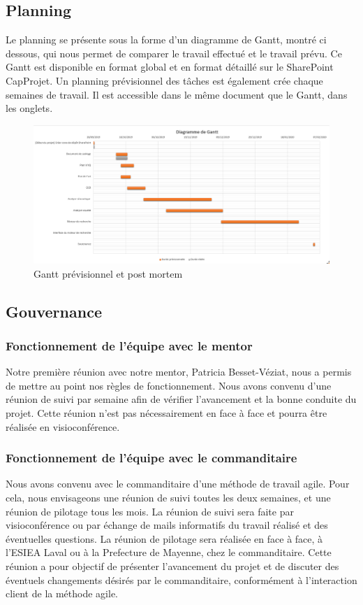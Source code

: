 \subsection{Planning}
Le planning se présente sous la forme d'un diagramme de Gantt, montré ci dessous, qui nous permet de comparer le travail effectué et le travail prévu.
Ce Gantt est disponible en format global et en format détaillé sur le SharePoint CapProjet.
Un planning prévisionnel des tâches est également crée chaque semaines de travail.
Il est accessible dans le même document que le Gantt, dans les onglets.

\begin{figure}[h!]
	\includegraphics[width=\linewidth]{images/gantt.png}
	\caption{Gantt prévisionnel et post mortem}
	\label{fig:MC}
\end{figure}		


\subsection{Gouvernance}
\subsubsection{Fonctionnement de l'équipe avec le mentor}
Notre première réunion avec notre mentor, Patricia Besset-Véziat, nous a permis de mettre au point nos règles de fonctionnement.
Nous avons convenu d'une réunion de suivi par semaine afin de vérifier l'avancement et la bonne conduite du projet.
Cette réunion n'est pas nécessairement en face à face et pourra être réalisée en visioconférence.


\subsubsection{Fonctionnement de l'équipe avec le commanditaire}
Nous avons convenu avec le commanditaire d'une méthode de travail agile.
Pour cela, nous envisageons une réunion de suivi toutes les deux semaines, et une réunion de pilotage tous les mois.
La réunion de suivi sera faite par visioconférence ou par échange de mails informatifs du travail réalisé et des éventuelles questions.
La réunion de pilotage sera réalisée en face à face, à l'ESIEA Laval ou à la Prefecture de Mayenne, chez le commanditaire.
Cette réunion a pour objectif de présenter l'avancement du projet et de discuter des éventuels changements désirés par le commanditaire, conformément à l'interaction client de la méthode agile.


